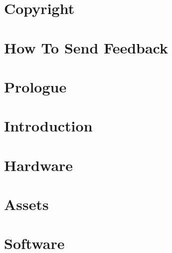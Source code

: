 \documentclass[8pt]{book}
\begin{document}
         

    \renewcommand{\rmdefault}{cmss} 
    \renewcommand{\familydefault}{\sfdefault}
    

    
    
    \cleardoublepage %
    
	\chapter*{Copyright}
           

       
    \chapter*{How To Send Feedback}
      
  
    \cleardoublepage %

    \setcounter{secnumdepth}{3} %
    
    
    
    
    \tableofcontents
    
    \pagebreak
    
    \chapter*{Prologue}
      

	\chapter{Introduction}
      
    
  
    \chapter{Hardware}
      
      
    \chapter{Assets}
    \label{chapter:assets}
      
      
    \chapter{Software}
       
       
       
       
       
       
       
       
\end{document}
